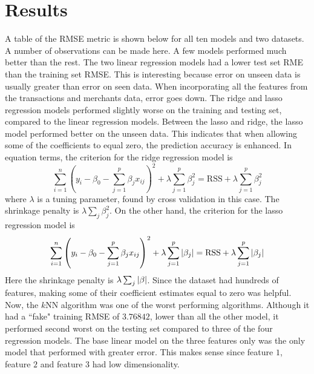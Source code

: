 \documentclass[journal, a4paper]{IEEEtran}
\begin{document}
\section{Results}
A table of the RMSE metric is shown below for all ten models and two datasets.  \\
\indent A number of observations can be made here. A few models performed much better than the rest. The two linear regression models had a lower test set RME than the training set RMSE. This is interesting because error on unseen data is usually greater than error on seen data. When incorporating all the features from the transactions and merchants data, error goes down. The ridge and lasso regression models performed slightly worse on the training and testing set, compared to the linear regression models. Between the lasso and ridge, the lasso model performed better on the unseen data. This indicates that when allowing some of the coefficients to equal zero, the prediction accuracy is enhanced. In equation terms, the criterion for the ridge regression model is $$ \sum_{i=1}^n \left(y_i - \beta_0 - \sum_{j=1}^p \beta_jx_{ij} \right)^2 + \lambda \sum_{j=1}^p \beta_j^2  = \text{RSS} + \lambda \sum_{j=1}^p \beta_j^2 $$ where $\lambda$ is a tuning parameter, found by cross validation in this case. The shrinkage penalty is $\lambda \sum_j \beta_j^2$. On the other hand, the criterion for the lasso regression model is $$ \sum_{i=1}^n \left(y_i - \beta_0 - \sum_{j=1}^p \beta_jx_{ij}\right)^2 + \lambda \sum_{j=1}^p \abs{\beta_j} = \text{RSS} + \lambda \sum_{j=1}^p \abs{\beta_j} $$ Here the shrinkage penalty is $\lambda \sum_j \abs{\beta}$. Since the dataset had hundreds of features, making some of their coefficient estimates equal to zero was helpful. Now, the $k$NN algorithm was one of the worst performing algorithms. Although it had a ``fake" training RMSE of $3.76842$, lower than all the other model, it performed second worst on the testing set compared to three of the four regression models. The base linear model on the three features only was the only model that performed with greater error. This makes sense since feature $1$, feature $2$ and feature $3$ had low dimensionality. 
\end{document}
